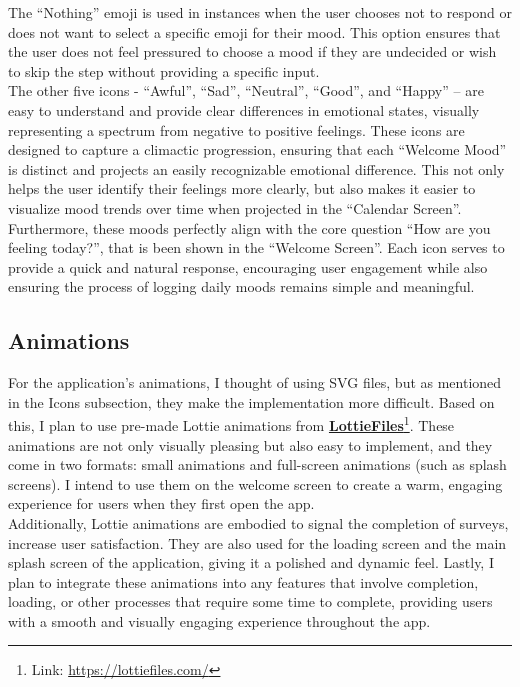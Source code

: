 \noindent The ``Nothing'' emoji is used in instances when the user chooses not to respond or does not want to select a specific emoji for their mood. This option ensures that the user does not feel pressured to choose a mood if they are undecided or wish to skip the step without providing a specific input.\vspace{5mm} \\
The other five icons - ``Awful'', ``Sad'', ``Neutral'', ``Good'', and ``Happy'' – are easy to understand and provide clear differences in emotional states, visually representing a spectrum from negative to positive feelings. These icons are designed to capture a climactic progression, ensuring that each ``Welcome Mood'' is distinct and projects an easily recognizable emotional difference. This not only helps the user identify their feelings more clearly, but also makes it easier to visualize mood trends over time when projected in the ``Calendar Screen''.\vspace{5mm} \\
Furthermore, these moods perfectly align with the core question ``How are you feeling today?'', that is been shown in the ``Welcome Screen''. Each icon serves to provide a quick and natural response, encouraging user engagement while also ensuring the process of logging daily moods remains simple and meaningful.

\subsection{Animations}

For the application’s animations, I thought of using SVG files, but as mentioned in the Icons subsection, they make the implementation more difficult. Based on this, I plan to use pre-made Lottie animations from \textbf{\href{https://lottiefiles.com/}{LottieFiles}}\footnote{Link: \url{https://lottiefiles.com/}}. These animations are not only visually pleasing but also easy to implement, and they come in two formats: small animations and full-screen animations (such as splash screens). I intend to use them on the welcome screen to create a warm, engaging experience for users when they first open the app.\vspace{5mm} \\
Additionally, Lottie animations are embodied to signal the completion of surveys, increase user satisfaction. They are also used for the loading screen and the main splash screen of the application, giving it a polished and dynamic feel. Lastly, I plan to integrate these animations into any features that involve completion, loading, or other processes that require some time to complete, providing users with a smooth and visually engaging experience throughout the app.

